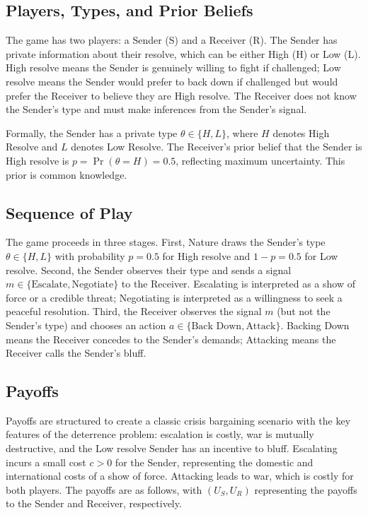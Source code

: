 \documentclass[12pt]{article}
\theoremstyle{plain}
\theoremstyle{definition}
\begin{document}
\subsection{Players, Types, and Prior Beliefs}

The game has two players: a Sender (S) and a Receiver (R). The Sender has private information about their resolve, which can be either High (H) or Low (L). High resolve means the Sender is genuinely willing to fight if challenged; Low resolve means the Sender would prefer to back down if challenged but would prefer the Receiver to believe they are High resolve. The Receiver does not know the Sender's type and must make inferences from the Sender's signal.

Formally, the Sender has a private type $\theta \in \{H, L\}$, where $H$ denotes High Resolve and $L$ denotes Low Resolve. The Receiver's prior belief that the Sender is High resolve is $p = \Pr(\theta = H) = 0.5$, reflecting maximum uncertainty. This prior is common knowledge.

\subsection{Sequence of Play}

The game proceeds in three stages. First, Nature draws the Sender's type $\theta \in \{H, L\}$ with probability $p = 0.5$ for High resolve and $1-p = 0.5$ for Low resolve. Second, the Sender observes their type and sends a signal $m \in \{\text{Escalate}, \text{Negotiate}\}$ to the Receiver. Escalating is interpreted as a show of force or a credible threat; Negotiating is interpreted as a willingness to seek a peaceful resolution. Third, the Receiver observes the signal $m$ (but not the Sender's type) and chooses an action $a \in \{\text{Back Down}, \text{Attack}\}$. Backing Down means the Receiver concedes to the Sender's demands; Attacking means the Receiver calls the Sender's bluff.

\subsection{Payoffs}

Payoffs are structured to create a classic crisis bargaining scenario with the key features of the deterrence problem: escalation is costly, war is mutually destructive, and the Low resolve Sender has an incentive to bluff. Escalating incurs a small cost $c > 0$ for the Sender, representing the domestic and international costs of a show of force. Attacking leads to war, which is costly for both players. The payoffs are as follows, with $(U_S, U_R)$ representing the payoffs to the Sender and Receiver, respectively.
\end{document}

